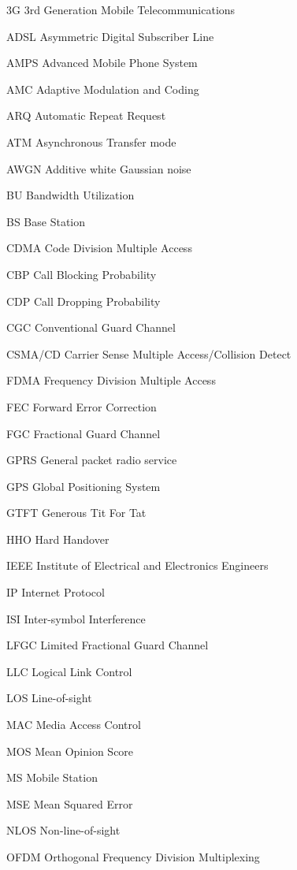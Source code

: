 \begin{denotation}
\item[3G] 3rd Generation Mobile Telecommunications
\item[ADSL] Asymmetric Digital Subscriber Line
\item[AMPS] Advanced Mobile Phone System
\item[AMC] Adaptive Modulation and Coding
\item[ARQ] Automatic Repeat Request
\item[ATM]Asynchronous Transfer mode
\item[AWGN]  Additive white Gaussian noise
\item[BU] Bandwidth Utilization
\item[BS] Base Station
\item[CDMA] Code Division Multiple Access 
\item[CBP] Call Blocking Probability
\item[CDP] Call Dropping Probability
\item[CGC] Conventional Guard Channel
\item[CSMA/CD] Carrier Sense Multiple Access/Collision Detect
\item[FDMA]Frequency Division Multiple Access
\item[FEC] Forward Error Correction
\item[FGC] Fractional Guard Channel
  \item[GPRS] General packet radio service
  \item[GPS] Global Positioning System
  \item[GTFT] Generous Tit For Tat
  \item[HHO] Hard Handover
  \item[IEEE] Institute of Electrical and Electronics Engineers
  \item[IP] Internet Protocol
  \item[ISI] Inter-symbol Interference
  \item[LFGC] Limited Fractional Guard Channel
  \item[LLC] Logical Link Control
  \item[LOS] Line-of-sight
  \item[MAC] Media Access Control
  \item[MOS] Mean Opinion Score
  \item[MS] Mobile Station
  \item[MSE] Mean Squared Error
  \item[NLOS] Non-line-of-sight
  \item[OFDM] Orthogonal Frequency Division Multiplexing 

\end{denotation}
